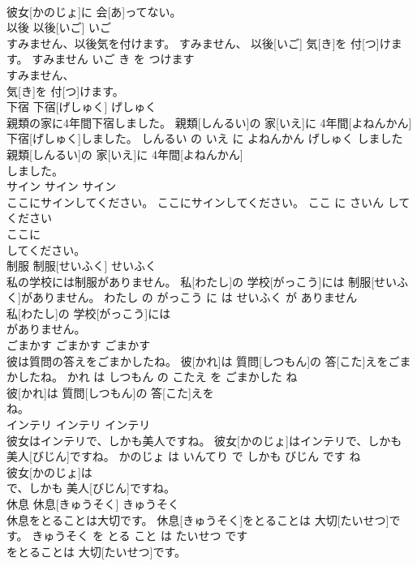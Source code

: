 \documentclass[8pt]{extreport}
\begin{document}
\begin{CJK}{UTF8}{min}
\\	彼女[かのじょ]に 会[あ]ってない。			
\\	以後	以後[いご]	いご	
\\	すみません、以後気を付けます。	すみません、 以後[いご] 気[き]を 付[つ]けます。	すみません いご き を つけます	
\\	すみません、
\\	気[き]を 付[つ]けます。			
\\	下宿	下宿[げしゅく]	げしゅく	
\\	親類の家に4年間下宿しました。	親類[しんるい]の 家[いえ]に 4年間[よねんかん] 下宿[げしゅく]しました。	しんるい の いえ に よねんかん げしゅく しました	
\\	親類[しんるい]の 家[いえ]に 4年間[よねんかん]
\\	しました。			
\\	サイン	サイン	サイン	
\\	ここにサインしてください。	ここにサインしてください。	ここ に さいん して ください	
\\	ここに
\\	してください。			
\\	制服	制服[せいふく]	せいふく	
\\	私の学校には制服がありません。	私[わたし]の 学校[がっこう]には 制服[せいふく]がありません。	わたし の がっこう に は せいふく が ありません	
\\	私[わたし]の 学校[がっこう]には
\\	がありません。			
\\	ごまかす	ごまかす	ごまかす	
\\	彼は質問の答えをごまかしたね。	彼[かれ]は 質問[しつもん]の 答[こた]えをごまかしたね。	かれ は しつもん の こたえ を ごまかした ね	
\\	彼[かれ]は 質問[しつもん]の 答[こた]えを
\\	ね。			
\\	インテリ	インテリ	インテリ	
\\	彼女はインテリで、しかも美人ですね。	彼女[かのじょ]はインテリで、しかも 美人[びじん]ですね。	かのじょ は いんてり で しかも びじん です ね	
\\	彼女[かのじょ]は
\\	で、しかも 美人[びじん]ですね。			
\\	休息	休息[きゅうそく]	きゅうそく	
\\	休息をとることは大切です。	休息[きゅうそく]をとることは 大切[たいせつ]です。	きゅうそく を とる こと は たいせつ です	
\\	をとることは 大切[たいせつ]です。			

\end{CJK}
\end{document}
